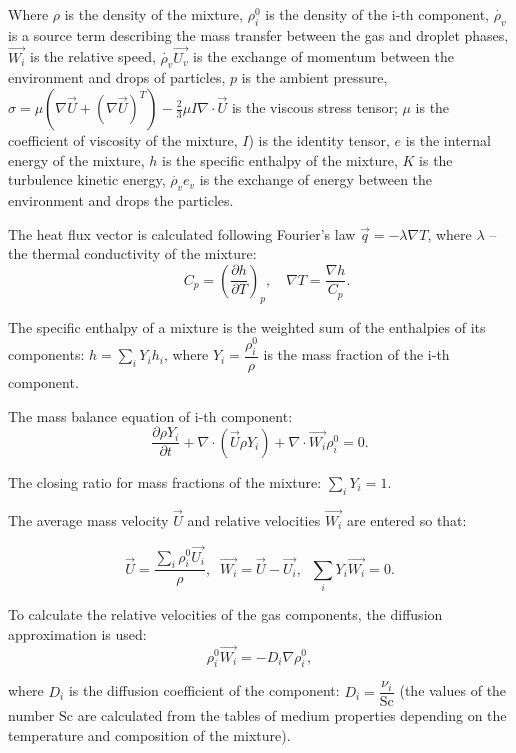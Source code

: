 \documentclass[aerospace,article,submit,moreauthors,pdftex]{Definitions/mdpi}
\begin{document}
Where $\rho$ is the density of the mixture, 
$\rho_{i}^{0}$ is the density of the i-th component,
$\dot{\rho_{v}}$ is a source term describing the mass transfer between the gas and droplet phases, $\vec{W_{i}}$ is the relative speed, $\dot{\rho_{v}}\vec{U_{v}}$ is the exchange of momentum between the environment and drops of particles, $p$ is the ambient pressure, 
$\widehat{\sigma} = \mu\left( \nabla\vec{U} + {(\nabla\vec{U})}^{T} \right) - \frac{2}{3}\mu I\nabla \cdot \vec{U}$ is the viscous stress tensor; $\mu$ is the coefficient of viscosity of the mixture, $I$) is the identity tensor, $e$ is the internal energy of the mixture, 
$h$ is the specific enthalpy of the mixture, $K$ is the turbulence kinetic energy, 
$\dot{\rho_{v}}e_{v}$ is the exchange of energy between the environment and drops the particles.

The heat flux vector is calculated following Fourier's law $\vec{q} = - \lambda\nabla T$, where $\lambda$ -- the thermal conductivity of the mixture: 
$$
\quad C_{p} = \left( \frac{\partial h}{\partial T} \right)_{p}, 
\quad \nabla T = \frac{\nabla h}{C_{p}}.
$$

The specific enthalpy of a mixture is the weighted sum of the enthalpies of its components: 
$h = \sum_{i}^{}{Y_{i}h_{i}}$, where $Y_{i} = \dfrac{\rho_{i}^{0}}{\rho}$ is the mass fraction of the i-th component.

The mass balance equation of i-th component:
\begin{equation}
\label{eq:massBalance_i}
  \frac{\partial\rho Y_{i}}{\partial t} + \nabla \cdot \left( \vec{U}\rho Y_{i} \right) + \nabla \cdot \vec{W_{i}}\rho_{i}^{0} = 0.  
\end{equation}

The closing ratio for mass fractions of the mixture: $\sum_{i}^{}Y_{i} = 1$.

The average mass velocity $\vec{U}$ and relative velocities $\vec{W_{i}}$ are entered so that:

$$
\vec{U} = \frac{\sum_{i}^{}{\rho_{i}^{0}\vec{U_{i}}}}{\rho}, \;\;
\vec{W_{i}} = \vec{U} - \vec{U_{i}}, \;\;
\sum_{i}^{}{Y_{i}\vec{W_{i}}} = 0.
$$ 

To calculate the relative velocities of the gas components, the diffusion approximation is used:
$$
\rho_{i}^{0}\vec{W_{i}} = - D_{i}\nabla\rho_{i}^{0},
$$

where $D_{i}$ is the diffusion coefficient of the component: $D_{i} = \dfrac{\nu_{i}}{\text{Sc}}$ (the values of the number$\text{\ Sc}$ are calculated from the tables of medium properties depending on the temperature and composition of the mixture).
\end{document}
